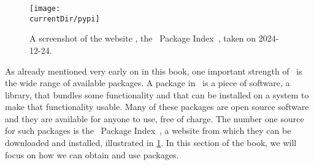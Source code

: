 %
%
\label{sec:usingPackages}%
%
\begin{figure}%
\centering%
\texttt{[image: \\currentDir/pypi]}%
\caption{A screenshot of the website , the \python\ Package Index~\cite{PSF:TPPIP}, taken on \mbox{2024-12-24}.}%
\label{fig:pypi}%
\end{figure}%
%
As already mentioned very early on in this book, one important strength of \python\ is the wide range of available packages.
A package in \python\ is a piece of software, a library, that bundles some functionality and that can be installed on a system to make that functionality usable.
Many of these packages are open source software and they are available for anyone to use, free of charge.
The number one source for such packages is the \python\ Package Index~\cite{PSF:TPPIP}, a website from which they can be downloaded and installed, illustrated in \cref{fig:pypi}.
In this section of the book, we will focus on how we can obtain and use packages.%
%
%
%
%
\endhsection%
%
